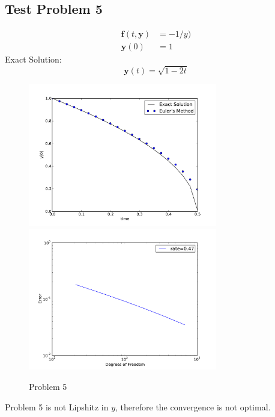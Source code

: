 \documentclass[10pt,letterpaper]{article}
\def\y{\mathbf{y}}
\def\f{\mathbf{f}}
\begin{document}
\subsection*{Test Problem 5}
\begin{align*}
\f(t,\y) &= -1/y)\\
\y(0) &= 1
\end{align*}
Exact Solution:
\[
\y(t)=\sqrt{1-2t}
\]
\begin{figure}[h!]
\centering
\includegraphics[width=3.25in,keepaspectratio=true]{./p5_1.pdf}
\includegraphics[width=3.25in,keepaspectratio=true]{./p5_2.pdf}
\caption{Problem 5}
\end{figure}

Problem 5 is not Lipshitz in $y$, therefore the convergence is not optimal.

\newpage 
\clearpage



\end{document}
